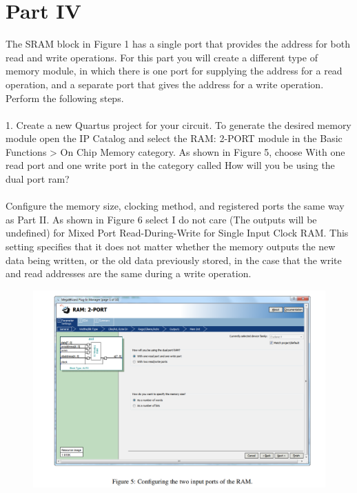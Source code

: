 




\section{Part IV} 
The SRAM block in Figure 1 has a single port that provides the address for both read and write operations. For this part you will create a different type of memory module, in which there is one port for supplying the address for a read operation, and a separate port that gives the address for a write operation. Perform the following steps. \\
\\
    1. Create a new Quartus project for your circuit. To generate the desired memory module open the IP Catalog
and select the RAM: 2-PORT module in the Basic Functions > On Chip Memory category. As shown in
Figure 5, choose With one read port and one write port in the category called How will you be using
the dual port ram?\\
\\
Configure the memory size, clocking method, and registered ports the same way as Part II. As shown in
Figure 6 select I do not care (The outputs will be undefined) for Mixed Port Read-During-Write for
Single Input Clock RAM. This setting specifies that it does not matter whether the memory outputs the
new data being written, or the old data previously stored, in the case that the write and read addresses are
the same during a write operation.
\begin{figure}[h]
    \centering
    \includegraphics[scale = 0.4]{source/picture/Lab8/bai8_minhhoa1.png}
\end{figure}
\newpage

